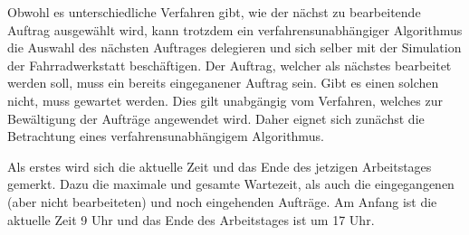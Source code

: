 \documentclass[a4paper,10pt,ngerman]{scrartcl}
\begin{document}
Obwohl es unterschiedliche Verfahren gibt,
wie der nächst zu bearbeitende Auftrag ausgewählt wird,
kann trotzdem ein verfahrensunabhängiger Algorithmus
die Auswahl des nächsten Auftrages delegieren
und sich selber mit der Simulation der Fahrradwerkstatt beschäftigen.
Der Auftrag, welcher als nächstes bearbeitet werden soll,
muss ein bereits eingeganener Auftrag sein.
Gibt es einen solchen nicht, muss gewartet werden.
Dies gilt unabgängig vom Verfahren,
welches zur Bewältigung der Aufträge angewendet wird.
Daher eignet sich zunächst
die Betrachtung eines verfahrensunabhängigem Algorithmus.

Als erstes wird sich die aktuelle Zeit
und das Ende des jetzigen Arbeitstages gemerkt.
Dazu die maximale und gesamte Wartezeit,
als auch die eingegangenen (aber nicht bearbeiteten) und noch eingehenden Aufträge.
Am Anfang ist die aktuelle Zeit 9 Uhr
und das Ende des Arbeitstages ist um 17 Uhr.
\end{document}
